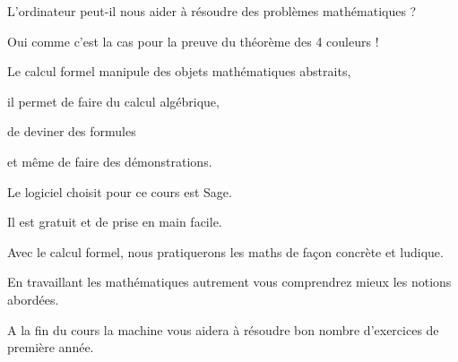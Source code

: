 



\newcommand{\un}[1]{[Arnaud] {\color{blue}{#1}}}
\newcommand{\deux}[1]{[François] {\color{red}{#1}}}
\newcommand{\trois}[1]{[Niels] {\color{orange}{#1}}}




\debuttexte




\diapo


L'ordinateur peut-il nous aider à résoudre des problèmes mathématiques ?

Oui comme c'est la cas pour la preuve du théorème des 4 couleurs !

Le calcul formel manipule des objets mathématiques abstraits, 

il permet de faire du calcul algébrique, 

de deviner des formules 

et même de faire des démonstrations.

\change






\change


Le logiciel choisit pour ce cours est Sage.

Il est gratuit et de prise en main facile.


Avec le calcul formel, nous pratiquerons les maths de façon concrète et ludique.

En travaillant les mathématiques autrement vous comprendrez mieux les notions abordées.

A la fin du cours la machine vous aidera à résoudre bon nombre d'exercices de première année.


